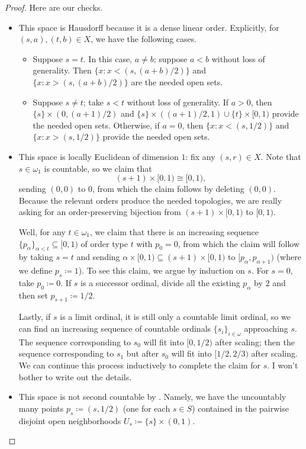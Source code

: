 \documentclass[../notes.tex]{subfiles}
\begin{document}
\begin{proof}
	Here are our checks.
	\begin{itemize}
		\item This space is Hausdorff because it is a dense linear order. Explicitly, for $(s,a),(t,b)\in X$, we have the following cases.
		\begin{itemize}
			\item Suppose $s=t$. In this case, $a\ne b$; suppose $a<b$ without loss of generality. Then $\{x:x<(s,(a+b)/2)\}$ and $\{x:x>(s,(a+b)/2)\}$ are the needed open sets.
			\item Suppose $s\ne t$; take $s<t$ without loss of generality. If $a>0$, then $\{s\}\times(0,(a+1)/2)$ and $\{s\}\times((a+1)/2,1)\cup\{t\}\times[0,1)$ provide the needed open sets. Otherwise, if $a=0$, then $\{x:x<(s,1/2)\}$ and $\{x:x>(s,1/2)\}$ provide the needed open sets.
		\end{itemize}

		\item This space is locally Euclidean of dimension $1$: fix any $(s,r)\in X$. Note that $s\in\omega_1$ is countable, so we claim that
		\[(s+1)\times[0,1)\cong[0,1),\]
		sending $(0,0)$ to $0$, from which the claim follows by deleting $(0,0)$. Because the relevant orders produce the needed topologies, we are really asking for an order-preserving bijection from $(s+1)\times[0,1)$ to $[0,1)$.
		
		Well, for any $t\in\omega_1$, we claim that there is an increasing sequence $\{p_\alpha\}_{\alpha<t}\subseteq[0,1)$ of order type $t$ with $p_0=0$, from which the claim will follow by taking $s=t$ and sending $\alpha\times[0,1)\subseteq(s+1)\times[0,1)$ to $[p_\alpha,p_{\alpha+1})$ (where we define $p_s\coloneqq1$). To see this claim, we argue by induction on $s$. For $s=0$, take $p_0\coloneqq0$. If $s$ is a successor ordinal, divide all the existing $p_\alpha$ by $2$ and then set $p_{s+1}\coloneqq1/2$.
		
		Lastly, if $s$ is a limit ordinal, it is still only a countable limit ordinal, so we can find an increasing sequence of countable ordinals $\{s_i\}_{i\in\omega}$ approaching $s$. The sequence corresponding to $s_0$ will fit into $[0,1/2)$ after scaling; then the sequence corresponding to $s_1$ but after $s_0$ will fit into $[1/2,2/3)$ after scaling. We can continue this process inductively to complete the claim for $s$. I won't bother to write out the details.

		\item This space is not second countable by . Namely, we have the uncountably many points $p_s\coloneqq(s,1/2)$ (one for each $s\in S$) contained in the pairwise disjoint open neighborhoods $U_s\coloneqq\{s\}\times(0,1)$.
		\qedhere
	\end{itemize}
\end{proof}
\end{document}

